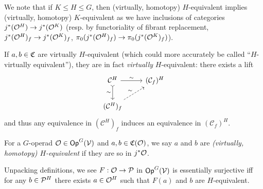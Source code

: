 \documentclass[a4paper,10pt
,draft
]{article}%
\renewcommand{\1}{\ensuremath{\mathbb{id}}}
\begin{document}
\begin{remark}
      \label{HK_EQUIV_REM}
      We note that if $K \leq H \leq G$, then (virtually, homotopy) $H$-equivalent implies (virtually, homotopy) $K$-equivalent
      as we have inclusions of categories
      $j^{\**}(\O^H) \to j^{\**}(\O^K)$
      (resp. by functoriality of fibrant replacement,
      $j^{\**}(\O^H)_f \to j^{\**}(\O^K)_f$,
      $\pi_0(j^{\**}(\O^H)_f) \to \pi_0(j^{\**}(\O^K)_f)$).
\end{remark}

\begin{remark}
      \label{HVIRT_REM}
      If $a,b\in \C$ are virtually $H$-equivalent (which could more accurately be called ``$H$-virtually equivalent''),
      they are in fact \textit{virtually} $H$-equivalent:
      there exists a lift
      \begin{equation}
            \label{FIBFIX_LIFT_EQ}
            \begin{tikzcd}
                  \mathcal C^H \arrow[d, tail, "\sim"'] \arrow[r, "\sim"]
                  &
                  (\mathcal C_f)^H
                  \\
                  (\mathcal C^H)_f \arrow[ur, dashed, "\sim"]
            \end{tikzcd}
      \end{equation}
      and thus any equivalence in $(\mathcal C^H)_f$ induces an equivalence in $(\mathcal C_f)^H$. 
\end{remark}

\begin{definition}
      For a $G$-operad $\O\in \mathsf{Op}^G(\V)$ and $a,b\in \C(\O)$, we say $a$ and $b$ are
      {\em (virtually, homotopy) $H$-equivalent}
      if they are so in $j^*\O$. 
\end{definition}

\begin{remark}
      \label{ESS_SUR_REM}
      Unpacking definitions, we see
      $F: \O \to \P$ in $\Op^G(\V)$ is essentially surjective iff
      for any $b \in \P^H$ there exists $a \in \O^H$ such that $F(a)$ and $b$ are $H$-equivalent.
\end{remark}
\end{document}
